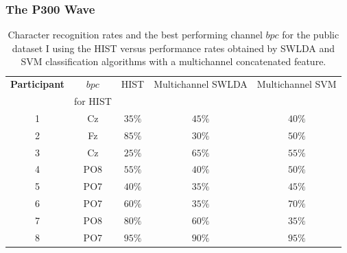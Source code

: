 \documentclass[aspectratio=169]{beamer}
\begin{document}
\begin{frame}
\frametitle{The P300 Wave}
\begin{center}
\begin{table}[h!]
\caption[Dataset I - Comparisons of Character Recognition Rates]{Character recognition rates and the best performing channel $bpc$ for the public dataset I  using the HIST versus performance rates obtained by SWLDA and SVM classification algorithms with a multichannel concatenated feature.}
\centering
\begin{tabular}{c|cc|c|c}
\toprule
\textbf{Participant}	&  $bpc$	&  HIST & Multichannel SWLDA & Multichannel SVM \\
                                    &  for HIST        &           &                                       &   \\
\midrule
1     &     Cz   &   $35\%$  & $45\%$  & $40\%$\\
2     &     Fz   &   $85\%$  & $30\%$   & $50\%$   \\
3     &     Cz   &   $25\%$  & $65\%$ & $55\%$   \\
4     &     PO8 &   $55\%$ & $40\%$  & $50\%$   \\
5     &     PO7 &   $40\%$ & $35\%$  & $45\%$   \\
6     &     PO7 &   $60\%$ &  $35\%$  & $70\%$   \\
7     &     PO8 &   $80\%$ & $60\%$   & $35\%$   \\
8     &     PO7 &   $95\%$  & $90\%$   & $95\%$  \\

\end{tabular}
\label{tab:resultsalsswlda}
\end{table}
\end{center}
\end{frame} 
\end{document}

